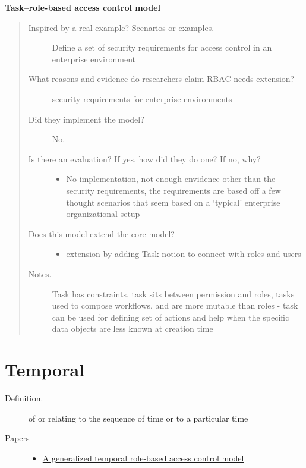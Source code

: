 \documentclass[letterpaper,10pt,english]{sphinxmanual}
\begin{document}
\textbf{Task–role-based access control model}
\begin{quote}
\begin{description}
\item[{Inspired by a real example? Scenarios or examples.}] \leavevmode
Define a set of security requirements for access control in an enterprise environment

\item[{What reasons and evidence do researchers claim RBAC needs extension?}]  security requirements for enterprise environments

\item[{Did they implement the model?}] \leavevmode
No.

\item[{Is there an evaluation? If yes, how did they do one? If no, why?}] \leavevmode\begin{itemize}
\item {} 
No implementation, not enough envidence other than the security requirements, the requirements are based off a few thought scenarios that seem based on a `typical' enterprise organizational setup

\end{itemize}

\item[{Does this model extend the core model?}] \leavevmode\begin{itemize}
\item {} 
extension by adding Task notion to connect with roles and users

\end{itemize}

\item[{Notes.}] \leavevmode
Task has constraints, task sits between permission and roles, tasks used to compose workflows, and are more mutable than roles - task can be used for defining set of actions and help when the specific data objects are less known at creation time

\end{description}
\end{quote}


\chapter{Temporal}
\label{categories/temporal:temporal}\label{categories/temporal::doc}\begin{description}
\item[{Definition.}] \leavevmode
of or relating to the sequence of time or to a particular time

\item[{Papers}] \leavevmode\begin{itemize}
\item {} 
\href{http://ieeexplore.ieee.org/xpls/abs\_all.jsp?arnumber=1363762}{A generalized temporal role-based access control model}

\end{itemize}

\end{description}
\end{document}
